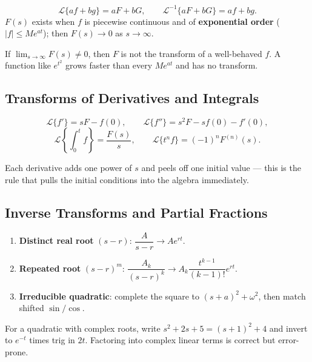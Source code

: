 \begin{formulabox}
\[ \mathcal{L}\{af+bg\}=aF+bG, \qquad \mathcal{L}^{-1}\{aF+bG\}=af+bg. \]
$F(s)$ exists when $f$ is piecewise continuous and of \textbf{exponential order}
($|f|\le Me^{at}$); then $F(s)\to 0$ as $s\to\infty$.
\end{formulabox}

\begin{warningbox}
If $\lim_{s\to\infty}F(s)\ne 0$, then $F$ is not the transform of a well-behaved $f$.
A function like $e^{t^2}$ grows faster than every $Me^{at}$ and has no transform.
\end{warningbox}

\subsection{Transforms of Derivatives and Integrals}

\begin{formulabox}
\[ \mathcal{L}\{f'\}=sF-f(0), \qquad \mathcal{L}\{f''\}=s^2F-sf(0)-f'(0), \]
\[ \mathcal{L}\!\left\{\int_0^t f\right\}=\frac{F(s)}{s}, \qquad
   \mathcal{L}\{t^n f\}=(-1)^n F^{(n)}(s). \]
\end{formulabox}

Each derivative adds one power of $s$ and peels off one initial value --- this is the
rule that pulls the initial conditions into the algebra immediately.

\subsection{Inverse Transforms and Partial Fractions}

\begin{methodbox}
\begin{enumerate}
    \item \textbf{Distinct real root} $(s-r)$: $\dfrac{A}{s-r}\to Ae^{rt}$.
    \item \textbf{Repeated root} $(s-r)^m$: $\dfrac{A_k}{(s-r)^k}\to A_k\dfrac{t^{k-1}}{(k-1)!}e^{rt}$.
    \item \textbf{Irreducible quadratic}: complete the square to $(s+a)^2+\omega^2$,
          then match shifted $\sin/\cos$.
\end{enumerate}
\end{methodbox}

\begin{warningbox}
For a quadratic with complex roots, write $s^2+2s+5=(s+1)^2+4$ and invert to
$e^{-t}$ times trig in $2t$. Factoring into complex linear terms is correct but
error-prone.
\end{warningbox}

